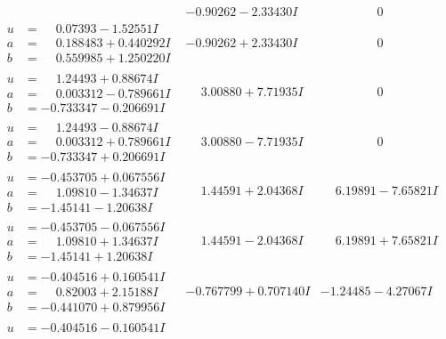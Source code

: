 \documentclass[1p]{elsarticle_modified}
\theoremstyle{definition}
\begin{document}
$$\begin{array}{c|c|c}
 & -0.90262 - 2.33430 I & \phantom{-0.000000 } 0 \\ \hline\begin{aligned}
u &= \phantom{-}0.07393 - 1.52551 I \\
a &= \phantom{-}0.188483 + 0.440292 I \\
b &= \phantom{-}0.559985 + 1.250220 I\end{aligned}
 & -0.90262 + 2.33430 I & \phantom{-0.000000 } 0 \\ \hline\begin{aligned}
u &= \phantom{-}1.24493 + 0.88674 I \\
a &= \phantom{-}0.003312 - 0.789661 I \\
b &= -0.733347 - 0.206691 I\end{aligned}
 & \phantom{-}3.00880 + 7.71935 I & \phantom{-0.000000 } 0 \\ \hline\begin{aligned}
u &= \phantom{-}1.24493 - 0.88674 I \\
a &= \phantom{-}0.003312 + 0.789661 I \\
b &= -0.733347 + 0.206691 I\end{aligned}
 & \phantom{-}3.00880 - 7.71935 I & \phantom{-0.000000 } 0 \\ \hline\begin{aligned}
u &= -0.453705 + 0.067556 I \\
a &= \phantom{-}1.09810 - 1.34637 I \\
b &= -1.45141 - 1.20638 I\end{aligned}
 & \phantom{-}1.44591 + 2.04368 I & \phantom{-}6.19891 - 7.65821 I \\ \hline\begin{aligned}
u &= -0.453705 - 0.067556 I \\
a &= \phantom{-}1.09810 + 1.34637 I \\
b &= -1.45141 + 1.20638 I\end{aligned}
 & \phantom{-}1.44591 - 2.04368 I & \phantom{-}6.19891 + 7.65821 I \\ \hline\begin{aligned}
u &= -0.404516 + 0.160541 I \\
a &= \phantom{-}0.82003 + 2.15188 I \\
b &= -0.441070 + 0.879956 I\end{aligned}
 & -0.767799 + 0.707140 I & -1.24485 - 4.27067 I \\ \hline\begin{aligned}
u &= -0.404516 - 0.160541 I \\

\end{aligned}
\end{array}$$
\end{document}
